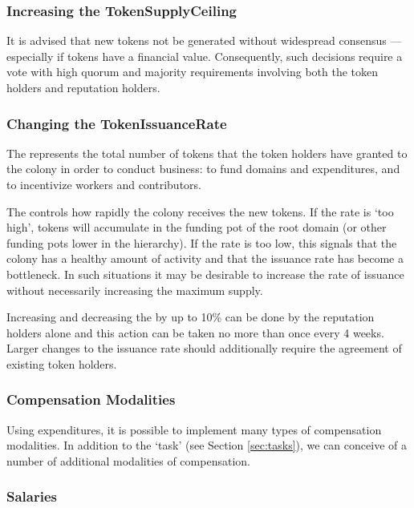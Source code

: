 \subsubsection*{Increasing the TokenSupplyCeiling}

 It is advised that new tokens not be generated without widespread consensus --- especially if tokens have a financial value. Consequently, such decisions require a vote with high quorum and majority requirements involving both the token holders and reputation holders.

\subsubsection*{Changing the TokenIssuanceRate}

The  represents the total number of tokens that the token holders have granted to the colony in order to conduct business: to fund domains and expenditures, and to incentivize workers and contributors.

The  controls how rapidly the colony receives the new tokens. If the rate is `too high', tokens will accumulate in the funding pot of the root domain (or other funding pots lower in the hierarchy). If the rate is too low, this signals that the colony has a healthy amount of activity and that the issuance rate has become a bottleneck. In such situations it may be desirable to increase the rate of issuance without necessarily increasing the maximum supply.

Increasing and decreasing the  by up to 10\% can be done by the reputation holders alone and this action can be taken no more than once every 4 weeks. Larger changes to the issuance rate should additionally require the agreement of existing token holders.

\subsubsection{Compensation Modalities}\label{sec:salary}

Using expenditures, it is possible to implement many types of compensation modalities. In addition to the `task' (see Section \ref{sec:tasks}), we can conceive of a number of additional modalities of compensation.

\subsubsection*{Salaries}

